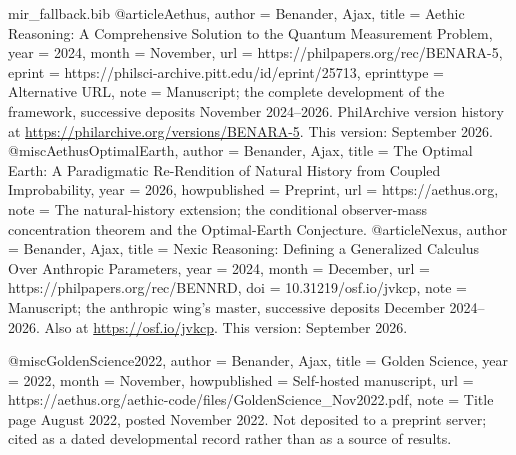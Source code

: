 \begin{filecontents}[overwrite]{mir_fallback.bib}
@article{Aethus,
  author      = {Benander, Ajax},
  title       = {Aethic Reasoning: A Comprehensive Solution to the Quantum Measurement Problem},
  year        = {2024},
  month       = {November},
  url         = {https://philpapers.org/rec/BENARA-5},
  eprint      = {https://philsci-archive.pitt.edu/id/eprint/25713},
  eprinttype  = {Alternative URL},
  note        = {Manuscript; the complete development of the framework, successive
                 deposits November 2024--2026. PhilArchive version history at
                 \url{https://philarchive.org/versions/BENARA-5}. This version: September 2026.}
}
@misc{AethusOptimalEarth,
  author       = {Benander, Ajax},
  title        = {The Optimal Earth: A Paradigmatic Re-Rendition of Natural History from Coupled Improbability},
  year         = {2026},
  howpublished = {Preprint},
  url          = {https://aethus.org},
  note         = {The natural-history extension; the conditional observer-mass
                  concentration theorem and the Optimal-Earth Conjecture.}
}
@article{Nexus,
  author      = {Benander, Ajax},
  title       = {Nexic Reasoning: Defining a Generalized Calculus Over Anthropic Parameters},
  year        = {2024},
  month       = {December},
  url         = {https://philpapers.org/rec/BENNRD},
  doi         = {10.31219/osf.io/jvkcp},
  note        = {Manuscript; the anthropic wing's master, successive deposits
                 December 2024--2026. Also at \url{https://osf.io/jvkcp}.
                 This version: September 2026.}
}

@misc{GoldenScience2022,
  author       = {Benander, Ajax},
  title        = {Golden Science},
  year         = {2022},
  month        = {November},
  howpublished = {Self-hosted manuscript},
  url          = {https://aethus.org/aethic-code/files/GoldenScience_Nov2022.pdf},
  note         = {Title page August 2022, posted November 2022. Not deposited to a
                  preprint server; cited as a dated developmental record rather than
                  as a source of results.}
}
\end{filecontents}
